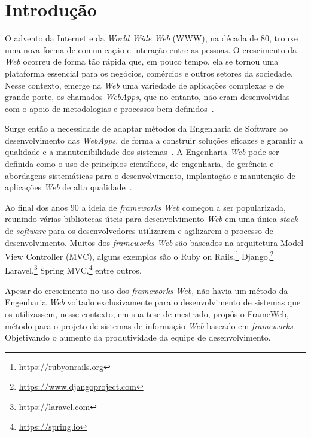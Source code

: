 \chapter{Introdução}
\label{chap-intro}

O advento da Internet e da \textit{World Wide Web} (WWW), na década de 80, trouxe uma nova
forma de comunicação e interação entre as pessoas. O crescimento da \textit{Web} ocorreu de forma tão
rápida que, em pouco tempo, ela se tornou uma plataforma essencial para os negócios, comércios
e outros setores da sociedade. Nesse contexto, emerge na \textit{Web} uma variedade de aplicações
complexas e de grande porte, os chamados \textit{WebApps}, que no entanto, não eram desenvolvidas com o apoio de
metodologias e processos bem definidos~\cite{murugesan:2001}.

Surge então a necessidade de adaptar métodos da Engenharia de Software ao desenvolvimento
das \textit{WebApps}, de forma a construir soluções eficazes e garantir a qualidade e a manutenibilidade 
dos sistemas~\cite{beder:2017}. A Engenharia \textit{Web} pode ser definida como o uso de 
princípios científicos, de engenharia, de gerência e abordagens sistemáticas para o desenvolvimento,
implantação e manutenção de aplicações \textit{Web} de alta qualidade~\cite{murugesan:2001}.

Ao final dos anos 90 a ideia de \textit{frameworks Web} começou a ser popularizada, reunindo 
várias bibliotecas úteis para desenvolvimento \textit{Web} em uma única \textit{stack} de \textit{software}
para os desenvolvedores utilizarem e agilizarem o processo de desenvolvimento. Muitos dos
\textit{frameworks Web} são baseados na arquitetura Model View Controller (MVC), alguns exemplos
são o Ruby on Rails,\footnote{\url{https://rubyonrails.org}} Django,\footnote{\url{https://www.djangoproject.com}} 
Laravel,\footnote{\url{https://laravel.com}} Spring MVC,\footnote{\url{https://spring.io}} entre outros.

Apesar do crescimento no uso dos \textit{frameworks Web}, não havia um método da Engenharia \textit{Web} 
voltado exclusivamente para o desenvolvimento de sistemas que os utilizassem, nesse contexto, em sua 
tese de mestrado,  propôs o FrameWeb, método para o projeto de sistemas de 
informação \textit{Web} baseado em \textit{frameworks}. Objetivando o aumento da produtividade da 
equipe de desenvolvimento.

